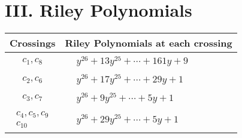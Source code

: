 \documentclass[1p]{elsarticle_modified}
\theoremstyle{definition}
\begin{document}
\centering \section*{ III. Riley Polynomials}
\begin{tabular}{m{50pt}|m{274pt}}
Crossings & \hspace{64pt}Riley Polynomials at each crossing \\
\hline $$\begin{aligned}c_{1},c_{8}\end{aligned}$$&$\begin{aligned}
&y^{26}+13 y^{25}+\cdots+161 y+9
\end{aligned}$\\
\hline $$\begin{aligned}c_{2},c_{6}\end{aligned}$$&$\begin{aligned}
&y^{26}+17 y^{25}+\cdots+29 y+1
\end{aligned}$\\
\hline $$\begin{aligned}c_{3},c_{7}\end{aligned}$$&$\begin{aligned}
&y^{26}+9 y^{25}+\cdots+5 y+1
\end{aligned}$\\
\hline $$\begin{aligned}c_{4},c_{5},c_{9}\\c_{10}\end{aligned}$$&$\begin{aligned}
&y^{26}+29 y^{25}+\cdots+5 y+1
\end{aligned}$\\
\hline
\end{tabular}
\vskip 2pc
\end{document}
